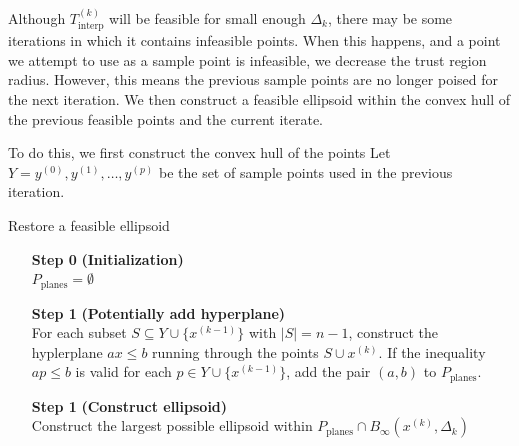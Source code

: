 \documentclass{article}
\newenvironment{comment}
  {\par\medskip
   \color{red}%
   \begin{framed}
   \textbf{Comment: }\ignorespaces}
 {\end{framed}
  \medskip}
\theoremstyle{case}
\newcommand{\xk}{{x^{(k)}}}
\newcommand{\dk}{\Delta_k}
\newcommand{\sampletrk}{{T_{\text{interp}}^{(k)}}}
\newcommand{\tr}{{ B_{\infty}\left(\xk, \dk\right) }}
\begin{document}
Although $\sampletrk$ will be feasible for small enough $\dk$, there may be some iterations in which it contains infeasible points.
When this happens, and a point we attempt to use as a sample point is infeasible, we decrease the trust region radius.
However, this means the previous sample points are no longer poised for the next iteration.
We then construct a feasible ellipsoid within the convex hull of the previous feasible points and the current iterate.

%             
% 


To do this, we first construct the convex hull of the points 
Let $Y = y^{(0)}, y^{(1)}, \ldots, y^{(p)}$ be the set of sample points used in the previous iteration.

\begin{algorithm}[H]
    \caption{Restore a feasible ellipsoid}
    \label{restore_feasible_ellipsoid}
    \begin{itemize}
        \item[\textbf{Step 0}] \textbf{(Initialization)} \\
            $P_{\textrm{planes}} = \emptyset$
            
        \item[\textbf{Step 1}] \textbf{(Potentially add hyperplane)} \\
	    For each subset $S \subseteq Y \cup \{x^{(k-1)}\}$ with $|S| = n - 1$, construct the hyplerplane $ax\le b$ running through the points $S \cup \xk$.
	    If the inequality $ap \le b$ is valid for each $p \in Y \cup \{x^{(k-1)}\}$, add the pair $(a, b)$ to $P_{\textrm{planes}}$.
	
	\item[\textbf{Step 1}] \textbf{(Construct ellipsoid)} \\
	   Construct the largest possible ellipsoid within $P_{\textrm{planes}} \cap \tr$
    \end{itemize}
\end{algorithm}
\end{document}
